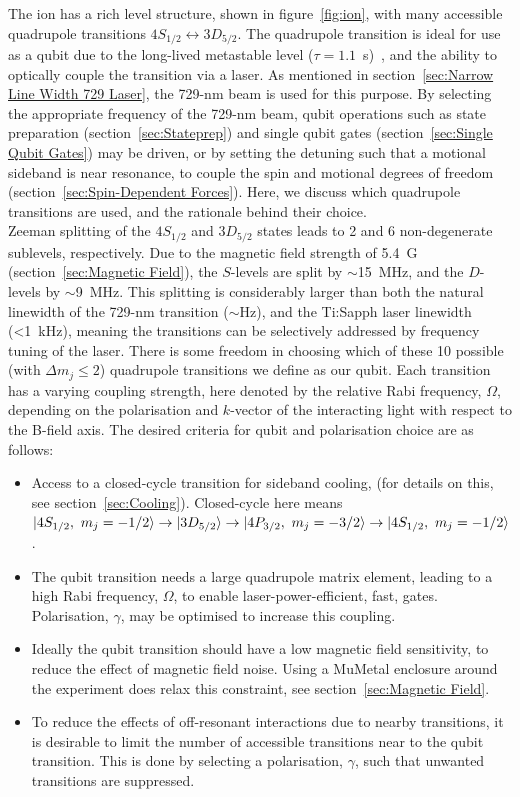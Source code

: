     The \ca ion has a rich level structure, shown in figure~\ref{fig:ion}, with many accessible quadrupole transitions $4S_{1/2}\leftrightarrow 3D_{5/2}$. The quadrupole transition is ideal for use as a qubit due to the long-lived metastable level ($\tau=1.1$~\unit{\s})~\cite{barton2000measurement}, and the ability to optically couple the transition via a laser. As mentioned in section~\ref{sec:Narrow Line Width 729 Laser}, the 729-nm beam is used for this purpose. By selecting the appropriate frequency of the 729-nm beam, qubit operations such as state preparation (section~\ref{sec:Stateprep}) and single qubit gates (section~\ref{sec:Single Qubit Gates}) may be driven, or by setting the detuning such that a motional sideband is near resonance, to couple the spin and motional degrees of freedom (section~\ref{sec:Spin-Dependent Forces}). Here, we discuss which quadrupole transitions are used, and the rationale behind their choice.\\ 
    Zeeman splitting of the $4S_{1/2}$ and $3D_{5/2}$ states leads to 2 and 6
    non-degenerate sublevels, respectively. Due to the magnetic field strength of 5.4~G (section~\ref{sec:Magnetic Field}),
    the $S$-levels are split by $\sim$15~\unit{\MHz}, and the $D$-levels by $\sim$9~\unit{\MHz}.
    This splitting is considerably larger than both the natural linewidth of the
    729-nm transition ($\sim$\unit{\Hz}), and the Ti:Sapph laser linewidth (<1~\unit{\kHz}), meaning the transitions can be 
    selectively addressed by frequency tuning of the laser. There is some freedom in choosing which of these 10 possible (with $\Delta m_j \leq 2$) quadrupole transitions we define as our qubit. Each transition has a varying coupling strength, here denoted by the relative Rabi frequency, $\Omega$, depending on the polarisation and $k$-vector of the interacting light with respect to the B-field axis. The desired criteria for qubit and polarisation choice are as follows:
    \begin{itemize}
    \item Access to a closed-cycle transition for sideband cooling, (for details on this, see section~\ref{sec:Cooling}). Closed-cycle here means $\ket{4S_{1/2},~m_j = -1/2} \rightarrow \ket{3D_{5/2}} \rightarrow \ket{4P_{3/2},~m_j = -3/2} \rightarrow \ket{4S_{1/2},~m_j = -1/2}$.
    \item The qubit transition needs a large quadrupole matrix element, leading to a high Rabi frequency, $\Omega$, to enable laser-power-efficient, fast, gates. Polarisation, $\gamma$, may be optimised to increase this coupling.
    \item Ideally the qubit transition should have a low magnetic field sensitivity, to reduce the effect of magnetic field noise. Using a MuMetal enclosure around the experiment does relax this constraint, see section~\ref{sec:Magnetic Field}.
    \item To reduce the effects of off-resonant interactions due to nearby transitions, it is desirable to limit the number of accessible transitions near to the qubit transition. This is done by selecting a polarisation, $\gamma$, such that unwanted transitions are suppressed.
    \end{itemize}
